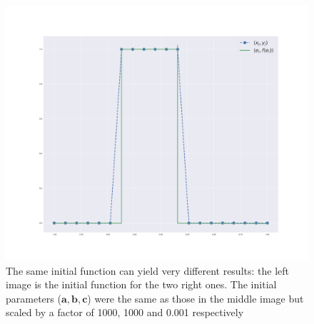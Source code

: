 \begin{figure}
    \includegraphics[width=\linewidth]{figures/same_init_different_func_square_1000.pdf}
    \endminipage
    
    \caption{The same initial function can yield very different results: the left image is the initial function for the two right ones. The initial parameters ($\bm a, \bm b, \bm c$) were the same as those in the middle image but scaled by a factor of 1000, 1000 and 0.001 respectively}
\end{figure}







